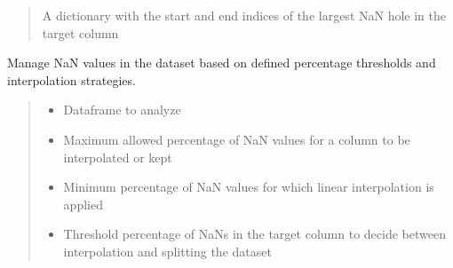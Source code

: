 \documentclass[letterpaper,10pt,english]{sphinxmanual}
\begin{document}
\begin{fulllineitems}
\begin{fulllineitems}
\begin{quote}
\begin{description}
\sphinxAtStartPar
A dictionary with the start and end indices of the largest NaN hole in the target column

\end{description}\end{quote}

\end{fulllineitems}


\begin{fulllineitems}
\label{\detokenize{docs/data_preprocessing:data_preprocessing.DataPreprocessor.manage_nan}}
\pysigstartsignatures
{}
\pysigstopsignatures
\sphinxAtStartPar
Manage NaN values in the dataset based on defined percentage thresholds and interpolation strategies.
\begin{quote}\begin{description}
\begin{itemize}
\item {} 
\sphinxAtStartPar
{} \textendash{} Dataframe to analyze

\item {} 
\sphinxAtStartPar
{} \textendash{} Maximum allowed percentage of NaN values for a column to be interpolated or kept

\item {} 
\sphinxAtStartPar
{} \textendash{} Minimum percentage of NaN values for which linear interpolation is applied

\item {} 
\sphinxAtStartPar
{} \textendash{} Threshold percentage of NaNs in the target column to decide between interpolation and splitting the dataset

\end{itemize}


\end{description}
\end{quote}
\end{fulllineitems}
\end{fulllineitems}
\end{document}
